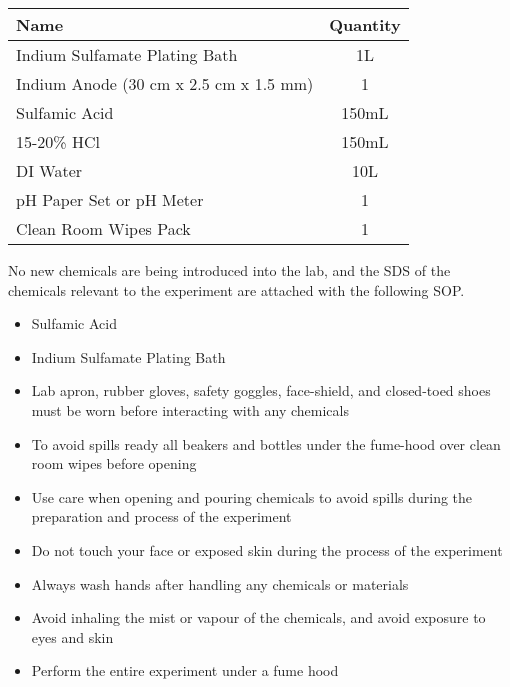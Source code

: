 \begin{tcolorbox}
\begin{center}
    \begin{tabular}{|l|c|}
        \hline
        \textbf{Name} & \textbf{Quantity} \\
        \hline
        Indium Sulfamate Plating Bath           & 1L \\
        Indium Anode (30 cm x 2.5 cm x 1.5 mm)  & 1 \\
        Sulfamic Acid                           & 150mL \\
        15-20\% HCl                             & 150mL \\
        DI Water                                & 10L \\
        pH Paper Set or pH Meter                & 1 \\
        Clean Room Wipes Pack                   & 1 \\
        \hline
    \end{tabular}

    \end{center}



    No new chemicals are being introduced into the lab, and the SDS of the chemicals relevant to the experiment are attached with the following SOP.

    \begin{itemize}
        \item Sulfamic Acid
        \item Indium Sulfamate Plating Bath
    \end{itemize}

    \begin{itemize}
        \item Lab apron, rubber gloves, safety goggles, face-shield, and closed-toed shoes must be worn before interacting with any chemicals
        \item To avoid spills ready all beakers and bottles under the fume-hood over clean room wipes before opening
        \item Use care when opening and pouring chemicals to avoid spills during the preparation and process of the experiment
        \item Do not touch your face or exposed skin during the process of the experiment
        \item Always wash hands after handling any chemicals or materials
        \item Avoid inhaling the mist or vapour of the chemicals, and avoid exposure to eyes and skin
        \item Perform the entire experiment under a fume hood
    \end{itemize}


\end{tcolorbox}
